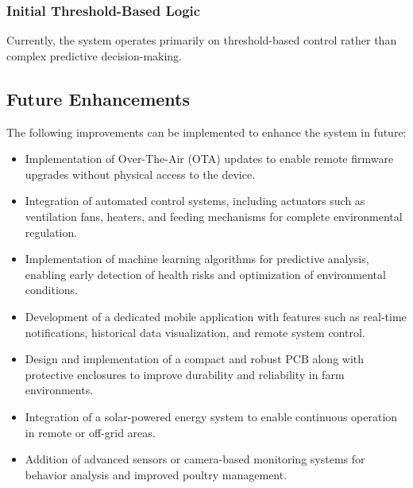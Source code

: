 \documentclass[../main.tex]{subfiles}
\begin{document}
\subsubsection{Initial Threshold-Based Logic}
Currently, the system operates primarily on threshold-based control rather than complex predictive decision-making.


\subsection{Future Enhancements}
The following improvements can be implemented to enhance the system in future:
\begin{itemize}
     \item Implementation of Over-The-Air (OTA) updates to enable remote firmware upgrades without physical access to the device.
    \item Integration of automated control systems, including actuators such as ventilation fans, heaters, and feeding mechanisms for complete environmental regulation.
    \item Implementation of machine learning algorithms for predictive analysis, enabling early detection of health risks and optimization of environmental conditions.
    \item Development of a dedicated mobile application with features such as real-time notifications, historical data visualization, and remote system control.
    \item Design and implementation of a compact and robust PCB along with protective enclosures to improve durability and reliability in farm environments.
    \item Integration of a solar-powered energy system to enable continuous operation in remote or off-grid areas.
    \item Addition of advanced sensors or camera-based monitoring systems for behavior analysis and improved poultry management.
\end{itemize}
\end{document}
